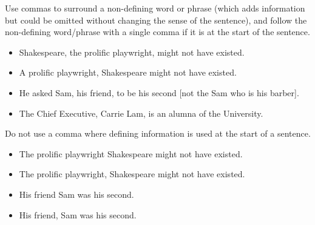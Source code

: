 \documentclass[11pt,a4paper]{book}
\newcommand{\xmark}{{\color{cadmiumred}\ding{54}}}%
\newcommand{\cmark}{{\color{green(html/cssgreen)}\checkmark}}%
\begin{document}
	\newpage
		Use commas to surround a non-defining word or phrase (which adds information but could be omitted without changing the sense of the sentence), and follow the non-defining word/phrase with a single comma if it is at the start of the sentence.
		{\firasans \begin{mdframed}[backgroundcolor=aliceblue] \begin{itemize}[label=\cmark]
			\item Shakespeare, the prolific playwright, might not have existed.
			\item A prolific playwright, Shakespeare might not have existed.
			\item He asked Sam, his friend, to be his second [not the Sam who is his barber].
			\item The Chief Executive, Carrie Lam, is an alumna of the University.
		\end{itemize} \end{mdframed} }
		Do not use a comma where defining information is used at the start of a sentence.
		{\firasans \begin{mdframed}[backgroundcolor=aliceblue] \begin{itemize}[label=\cmark]
			\item The prolific playwright Shakespeare might not have existed.
			\item[\xmark] The prolific playwright, Shakespeare might not have existed.
			\item His friend Sam was his second.
			\item[\xmark] His friend, Sam was his second.
		\end{itemize} \end{mdframed} }
\end{document}
